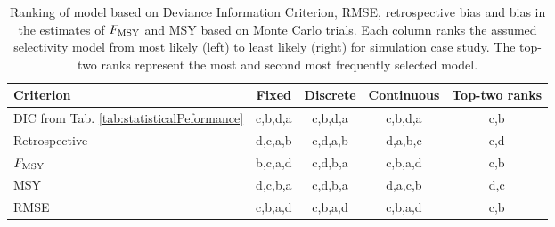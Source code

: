 \begin{table*}[!tbh]
	\caption{Ranking of model based on Deviance Information Criterion, RMSE, retrospective bias and bias in the estimates of $F_{\rm{MSY}}$ and MSY based on Monte Carlo trials. Each column ranks the assumed selectivity model from most likely (left) to least likely (right) for simulation case study.  The top-two ranks represent the most and second most frequently selected model.}
	\label{tab:rankorder}
	\begin{center}
		\begin{tabular}{l|ccc|c}
		\hline

		\hline
		\textbf{Criterion} & \textbf{Fixed} & \textbf{Discrete} &\textbf{Continuous} & \textbf{Top-two ranks} \\
		\hline
		DIC from Tab. \ref{tab:statisticalPeformance}
		           & c,b,d,a & c,b,d,a & c,b,d,a & c,b\\
		\hline
		Retrospective    & d,c,a,b & c,d,a,b & d,a,b,c & c,d\\
		$F_{\rm{MSY}}$   & b,c,a,d & c,d,b,a & c,b,a,d & c,b\\
		MSY              & d,c,b,a & c,d,b,a & d,a,c,b & d,c\\
		RMSE             & c,b,a,d & c,b,a,d & c,b,a,d & c,b\\
		\hline

		\hline
		\end{tabular}
	\end{center}
\end{table*}


